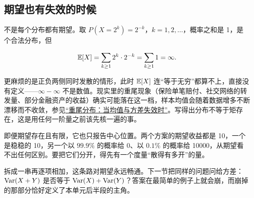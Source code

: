 \subsection{期望也有失效的时候}

不是每个分布都有期望。取 \(P(X=2^k)=2^{-k}\)，\(k=1,2,\ldots\)，概率之和是 1，是个合法分布，但

\[
\mathbb{E}[X]=\sum_{k\ge1}2^k\cdot2^{-k}=\sum_{k\ge1}1=\infty.
\]

更麻烦的是正负两侧同时发散的情形，此时 \(\mathbb{E}[X]\) 连``等于无穷''都算不上，直接没有定义——\(\infty-\infty\) 不是数值。现实里的重尾现象（保险单笔赔付、社交网络的转发量、部分金融资产的收益）确实可能落在这一档，样本均值会随着数据增多不断漂移而不收敛，参见\hyperref[sec:05-Probability/06-Common-Distributions/07]{``重尾分布：当均值与方差失效时''}。写得出分布不等于矩存在，这是用任何一阶量之前该先核一遍的事。

即便期望存在且有限，它也只报告中心位置。两个方案的期望收益都是 10，一个是稳稳的 10，另一个以 \(99.9\%\) 的概率给 0、以 \(0.1\%\) 的概率给 10000，从期望看不出任何区别。要把它们分开，得先有一个度量``散得有多开''的量。

拆成一串再逐项相加，这条路对期望永远畅通。下一节把同样的问题问给方差：\(\operatorname{Var}(X+Y)\) 是否等于 \(\operatorname{Var}(X)+\operatorname{Var}(Y)\)？答案在最简单的例子上就会崩，而崩掉的那部分恰好定义了本单元后半段的主角。

